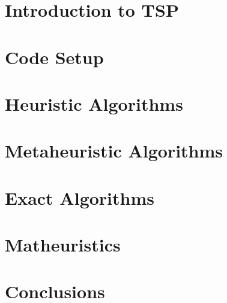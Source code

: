 \documentclass[a4paper,12pt]{book}
\begin{document}
\thispagestyle{empty} %
\cleardoublepage

\thispagestyle{empty}

\clearpage{\pagestyle{plain}\cleardoublepage}


\clearpage{\pagestyle{plain}\cleardoublepage}

\tableofcontents %

\clearpage{\pagestyle{plain}\cleardoublepage} %

\clearpage{\pagestyle{plain}\cleardoublepage} 
\chapter{Introduction to TSP} 
\label{chapter:intro} 


\clearpage{\pagestyle{plain}\cleardoublepage} 
\chapter{Code Setup} 
\label{chapter:code} 


\clearpage{\pagestyle{plain}\cleardoublepage} 
\chapter{Heuristic Algorithms} 
\label{chapter:heuristics} 
 

\clearpage{\pagestyle{plain}\cleardoublepage} 
\chapter{Metaheuristic Algorithms} 
\label{chapter:meta} 
 

\clearpage{\pagestyle{plain}\cleardoublepage} 
\chapter{Exact Algorithms} 
\label{chapter:exact} 




\clearpage{\pagestyle{plain}\cleardoublepage} 
\chapter{Matheuristics} 
\label{chapter:matheuristics} 


\clearpage{\pagestyle{plain}\cleardoublepage} 
\chapter{Conclusions} 
\label{chapter:conclusion} 



\clearpage{\pagestyle{plain}\cleardoublepage}

\nocite{*}

%
\end{document}
